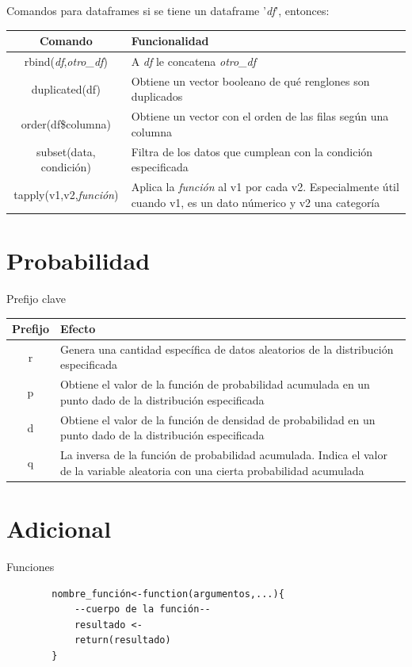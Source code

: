 \documentclass[aspectratio=169,xcolor=dvipsnames]{beamer}
\begin{document}
\begin{frame}{Comandos para dataframes}
    si se tiene un dataframe '\textit{df}', entonces:
    \begin{center}
        \begin{tabular}{|c|p{9cm}|}
            \hline
            \textbf{Comando} & \textbf{Funcionalidad} \\ \hline
            rbind(\textit{df},\textit{otro\_df}) & A \textit{df} le concatena \textit{otro\_df} \\ \hline
            duplicated(df) & Obtiene un vector booleano de qué renglones son duplicados \\ \hline
            order(df\$columna) & Obtiene un vector con el orden de las filas según una columna \\ \hline
            subset(data, condición) & Filtra de los datos que cumplean con la condición especificada \\ \hline
            tapply(v1,v2,\textit{función}) & Aplica la \textit{función} al v1 por cada v2. Especialmente útil cuando v1, 
                                            es un dato númerico y v2 una categoría \\
            \hline
        \end{tabular}
    \end{center}
\end{frame}

\section{Probabilidad}
\begin{frame}{Prefijo clave}
    \begin{center}
        \begin{tabular}{|c|p{12cm}|}
            \hline
            \textbf{Prefijo} & \textbf{Efecto} \\ \hline
            r & Genera una cantidad específica de datos aleatorios de la distribución especificada \\ \hline
            p & Obtiene el valor de la función de probabilidad acumulada en un punto dado de la distribución especificada \\ \hline
            d & Obtiene el valor de la función de densidad de probabilidad en un punto dado de la distribución especificada \\ \hline
            q & La inversa de la función de probabilidad acumulada. Indica el valor de la variable aleatoria con una cierta probabilidad acumulada \\\hline
        \end{tabular}
    \end{center}
\end{frame}

\section{Adicional}

\begin{frame}[fragile]{Funciones}
    \begin{verbatim}
        nombre_función<-function(argumentos,...){
            --cuerpo de la función--
            resultado <-
            return(resultado)
        }
    \end{verbatim}
\end{frame}
\end{document}
